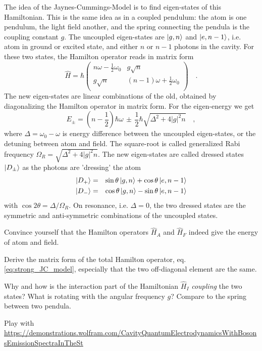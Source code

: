 The idea of the Jaynes-Cummings-Model is to find eigen-states of this Hamiltonian. This is the same idea as in a coupled pendulum: the atom is one pendulum, the light field another, and the spring connecting the pendula is the coupling constant $g$. The uncoupled eigen-states are $\ket{g, n}$ and  $\ket{e, n-1}$, i.e. atom in ground or excited state, and either $n$ or $n-1$ photons in the cavity. For these two states, the Hamilton operator reads in matrix form
\begin{equation}
\hat{H} = \hbar 
\begin{pmatrix}
n \omega - \frac{1}{2} \omega_0  & g \sqrt{n} \\
g \sqrt{n} & (n-1) \omega + \frac{1}{2} \omega_0 \\
\end{pmatrix}  \quad . \label{eq:strong_JC_model}
\end{equation}
The new eigen-states are linear combinations of the old, obtained by diagonalizing the Hamilton operator in matrix form. For the eigen-energy we get
\begin{equation}
E_\pm = \left( n - \frac{1}{2} \right) \hbar \omega \, \pm \, \frac{1}{2} \hbar
\sqrt{\Delta^2 + 4 |g|^2 n}  \quad ,
\end{equation}
where $\Delta = \omega_0 - \omega$
is energy difference between the uncoupled eigen-states, or the detuning between atom and field. The square-root is called generalized Rabi frequency $\Omega_R = \sqrt{\Delta^2 + 4 |g|^2 n}$. The new eigen-states are called dressed states $\ket{D_\pm}$ as the photons are 'dressing' the atom
\begin{eqnarray}
\ket{D_+} &= &\sin \theta \ket{g,n} + \cos \theta \ket{e,n-1} \\
\ket{D_-} & = &\cos \theta \ket{g,n} - \sin \theta \ket{e,n-1}   
\end{eqnarray}
with $\cos 2\theta = \Delta / \Omega_R$. On resonance, i.e. $\Delta = 0$, the two dressed states are the symmetric and anti-symmetric combinations of the uncoupled states.


\begin{questions}
\item Convince yourself that the Hamilton operators $\hat{H}_A$ and $\hat{H}_F$ indeed give the energy of atom and field.


\item Derive the matrix form of the total Hamilton operator, eq.
\ref{eq:strong_JC_model}, especially that the two off-diagonal element are the same.


\item Why and how is the interaction part of the Hamiltonian $\hat{H}_I$ \emph{coupling} the two states? What is rotating with the angular frequency $g$? Compare to the spring between two pendula.

\item Play with \href{https://demonstrations.wolfram.com/CavityQuantumElectrodynamicsWithBosonsEmissionSpectraInTheSt}
{https://demonstrations.wolfram.com/CavityQuantumElectrodynamicsWithBosonsEmissionSpectraInTheSt}

\end{questions}


